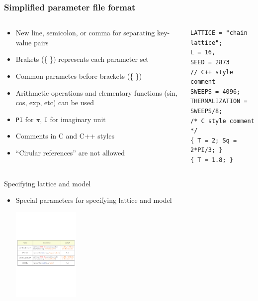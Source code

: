 \begin{frame}[t,fragile]
  \frametitle{Simplified parameter file format}
  \begin{columns}[T]
    \begin{column}{.6\textwidth}
      \begin{itemize}
        \item New line, semicolon, or comma for separating key-value pairs
        \item Brakets (\{ \}) represents each parameter set
        \item Common parametes before brackets (\{ \})
        \item Arithmetic operations and elementary functions (sin, cos, exp, etc) can be used
        \item {\tt PI} for $\pi$, {\tt I} for imaginary unit
        \item Comments in C and C++ styles
        \item ``Cirular references'' are not allowed
      \end{itemize}
    \end{column}
    \begin{column}{.4\textwidth}
    \begin{lstlisting}
LATTICE = "chain lattice";
L = 16,
SEED = 2873
// C++ style comment
SWEEPS = 4096;
THERMALIZATION = SWEEPS/8;
/* C style comment */
{ T = 2; Sq = 2*PI/3; }
{ T = 1.8; }
    \end{lstlisting}
    \end{column}
  \end{columns}
\end{frame}

\begin{frame}[t,fragile]{Specifying lattice and model}
  \begin{itemize}
  \item Special parameters for specifying lattice and model
  \begin{center}
    \includegraphics[height=4.5cm]{simulation5.pdf}
  \end{center}
  \end{itemize}
\end{frame}

